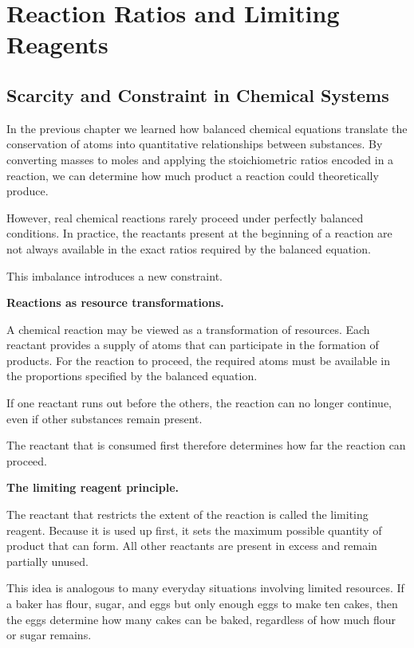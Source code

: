 \documentclass[11pt, openany]{book}
\theoremstyle{plain}
\theoremstyle{definition}
\theoremstyle{remark}
\begin{document}
\chapter{Reaction Ratios and Limiting Reagents}

\section*{Scarcity and Constraint in Chemical Systems}

In the previous chapter we learned how balanced chemical equations
translate the conservation of atoms into quantitative relationships
between substances. By converting masses to moles and applying the
stoichiometric ratios encoded in a reaction, we can determine how much
product a reaction could theoretically produce.

However, real chemical reactions rarely proceed under perfectly balanced
conditions. In practice, the reactants present at the beginning of a
reaction are not always available in the exact ratios required by the
balanced equation.

This imbalance introduces a new constraint.

\medskip

\textbf{Reactions as resource transformations.}

A chemical reaction may be viewed as a transformation of resources. Each
reactant provides a supply of atoms that can participate in the
formation of products. For the reaction to proceed, the required atoms
must be available in the proportions specified by the balanced
equation.

If one reactant runs out before the others, the reaction can no longer
continue, even if other substances remain present.

The reactant that is consumed first therefore determines how far the
reaction can proceed.

\medskip

\textbf{The limiting reagent principle.}

The reactant that restricts the extent of the reaction is called the
limiting reagent. Because it is used up first, it sets the maximum
possible quantity of product that can form. All other reactants are
present in excess and remain partially unused.

This idea is analogous to many everyday situations involving limited
resources. If a baker has flour, sugar, and eggs but only enough eggs to
make ten cakes, then the eggs determine how many cakes can be baked,
regardless of how much flour or sugar remains.
\end{document}
